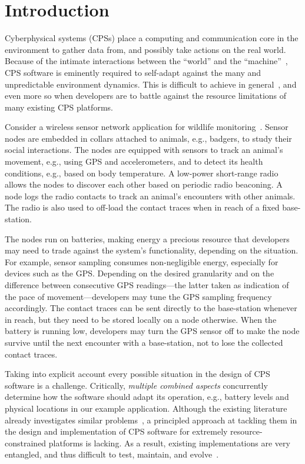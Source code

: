 \section{Introduction}

Cyberphysical systems (CPSs) place a computing and communication core
in the environment to gather data from, and possibly take actions on
the real world. Because of the intimate interactions between the
``world'' and the ``machine''~\cite{Jackson:1995:WM:225014.225041},
CPS software is eminently required to self-adapt against the many and
unpredictable environment dynamics. This is difficult to achieve in
general~\cite{cheng:adaptive}, and even more so when developers are to
battle against the resource limitations of many existing CPS
platforms.

 Consider a wireless sensor network application for
wildlife monitoring~\cite{pasztor10:selective}.  Sensor nodes are
embedded in collars attached to animals, e.g., badgers, to study their
social interactions. The nodes are equipped with sensors to track an
animal's movement, e.g., using GPS and accelerometers, and to detect
its health conditions, e.g., based on body temperature.  A low-power
short-range radio allows the nodes to discover each other based on
periodic radio beaconing.  A node logs the radio contacts to track an
animal's encounters with other animals. The radio is also used to
off-load the contact traces when in reach of a fixed base-station.

The nodes run on batteries, making energy a precious resource that
developers may need to trade against the system's functionality,
depending on the situation. For example, sensor sampling consumes
non-negligible energy, especially for devices such as the
GPS. Depending on the desired granularity and on the difference
between consecutive GPS readings---the latter taken as indication of
the pace of movement---developers may tune the GPS sampling frequency
accordingly. The contact traces can be sent directly to the
base-station whenever in reach, but they need to be stored locally on
a node otherwise.  When the battery is running low, developers may
turn the GPS sensor off to make the node survive until the next
encounter with a base-station, not to lose the collected contact
traces.

 Taking into explicit account every
possible situation in the design of CPS software is a
challenge. Critically, \emph{multiple combined aspects} concurrently
determine how the software should adapt its operation, e.g., battery
levels and physical locations in our example application. Although the
existing literature already investigates similar
problems~\cite{cheng:adaptive}, a principled approach at tackling them
in the design and implementation of CPS software for extremely
resource-constrained platforms is lacking. As a result, existing
implementations are very entangled, and thus difficult to test,
maintain, and evolve~\cite{Picco:2010:SEW:1882362.1882421}.

